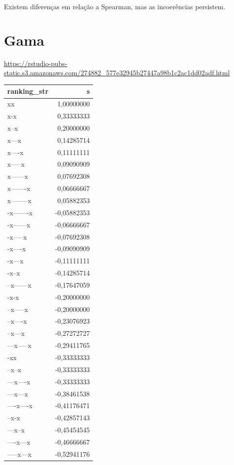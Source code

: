 \documentclass[
  letterpaper,
  DIV=11,
  numbers=noendperiod]{scrreprt}
\begin{document}
Existem diferenças em relação a Spearman, mas as incoerências persistem.

\section{Gama}\label{gama}

\url{https://rstudio-pubs-static.s3.amazonaws.com/274882_577e32945b27447a98b1c2ac1dd02adf.html}

\begin{longtable*}{lr}
\toprule
ranking\_str & s \\ 
\midrule\addlinespace[2.5pt]
xx & 1,00000000 \\ 
x-x & 0,33333333 \\ 
x--x & 0,20000000 \\ 
x---x & 0,14285714 \\ 
x----x & 0,11111111 \\ 
x-----x & 0,09090909 \\ 
x------x & 0,07692308 \\ 
x-------x & 0,06666667 \\ 
x--------x & 0,05882353 \\ 
-x-------x & -0,05882353 \\ 
-x------x & -0,06666667 \\ 
-x-----x & -0,07692308 \\ 
-x----x & -0,09090909 \\ 
-x---x & -0,11111111 \\ 
-x--x & -0,14285714 \\ 
--x------x & -0,17647059 \\ 
-x-x & -0,20000000 \\ 
--x-----x & -0,20000000 \\ 
--x----x & -0,23076923 \\ 
--x---x & -0,27272727 \\ 
---x-----x & -0,29411765 \\ 
-xx & -0,33333333 \\ 
--x--x & -0,33333333 \\ 
---x----x & -0,33333333 \\ 
---x---x & -0,38461538 \\ 
----x----x & -0,41176471 \\ 
--x-x & -0,42857143 \\ 
---x--x & -0,45454545 \\ 
----x---x & -0,46666667 \\ 
-----x---x & -0,52941176 \\ 

\end{longtable*}
\end{document}
